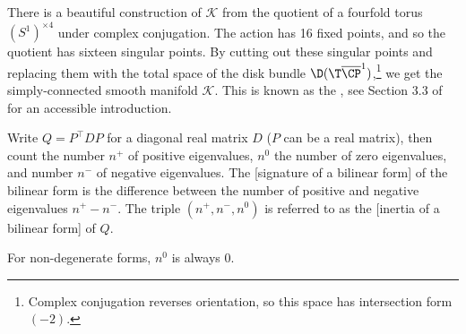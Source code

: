 \begin{definition}
\begin{remark}\label{rmk:kummer-construction}
	There is a beautiful construction of $\mathcal{K}$ from the quotient of a fourfold torus $(S^1)^{\times 4}$ under complex conjugation. The action has 16 fixed points, and so the quotient has sixteen singular points. By cutting out these singular points and replacing them with the total space of the disk bundle $\D(\T \overline{\CP}^1)$,\footnote{Complex conjugation reverses orientation, so this space has intersection form $(-2)$.} we get the simply-connected smooth manifold $\mathcal{K}$. This is known as the , see Section 3.3 of \cite{scorpan2005wild} for an accessible introduction.
\end{remark}

\begin{definition}
	Write $Q=P^\intercal D P$ for a diagonal real matrix $D$ ($P$ can be a real matrix), then count the number $n^+$ of positive eigenvalues, $n^0$ the number of zero eigenvalues, and number $n^-$ of negative eigenvalues. The [signature of a bilinear form] of the bilinear form is the difference between the number of positive and negative eigenvalues $n^+-n^-$.
	The triple $(n^+, n^-, n^0)$ is referred to as the [inertia of a bilinear form] of $Q$.
\end{definition}

\begin{remark}
	For non-degenerate forms, $n^0$ is always $0$.
\end{remark}


\end{definition}
